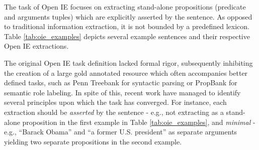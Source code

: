 
The task of Open IE focuses on extracting stand-alone propositions (predicate and arguments tuples)
which are explicitly asserted by the sentence.
As opposed to traditional information extraction, it is not bounded by a predefined lexicon.
Table \ref{tab:oie_examples} depicts several example sentences and their respective Open IE extractions.

The original Open IE task definition lacked formal rigor,
subsequently inhibiting the creation of a large gold annotated resource
which often accompanies better defined tasks,
such as Penn Treebank \cite{ptb} for syntactic parsing or PropBank \cite{propbank} for semantic role labeling.
In spite of this, recent work \cite{bhutani2016nested,Stanovsky2016EMNLP} have managed
to identify several principles upon which the task has converged.
For instance, each extraction should be \emph{asserted} by the sentence -
e.g., not extracting  as a stand-alone proposition in the first example in Table \ref{tab:oie_examples},
and \emph{minimal} - e.g., ``Barack Obama'' and ``a former U.S. president''
as separate arguments yielding two separate propositions in the second example.




